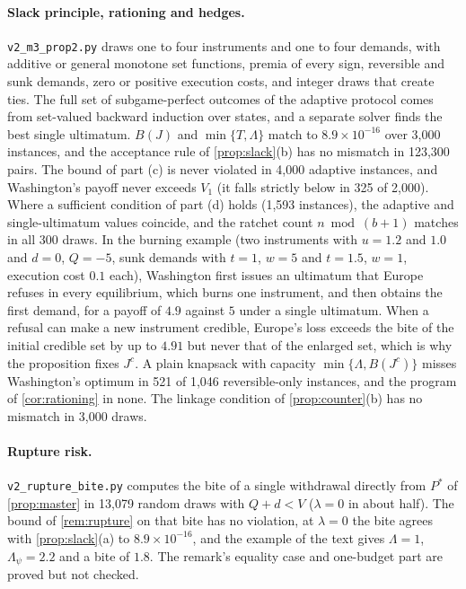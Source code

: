 \paragraph{Slack principle, rationing and hedges.} \texttt{v2\_m3\_prop2.py} draws one to four instruments and one to four demands, with additive or general monotone set functions, premia of every sign, reversible and sunk demands, zero or positive execution costs, and integer draws that create ties. The full set of subgame-perfect outcomes of the adaptive protocol comes from set-valued backward induction over states, and a separate solver finds the best single ultimatum. $B(J)$ and $\min\{T,\Lambda\}$ match to $8.9\times10^{-16}$ over 3,000 instances, and the acceptance rule of \cref{prop:slack}(b) has no mismatch in 123,300 pairs. The bound of part (c) is never violated in 4,000 adaptive instances, and Washington's payoff never exceeds $V_1$ (it falls strictly below in 325 of 2,000). Where a sufficient condition of part (d) holds (1,593 instances), the adaptive and single-ultimatum values coincide, and the ratchet count $n\bmod(b+1)$ matches in all 300 draws. In the burning example (two instruments with $u=1.2$ and $1.0$ and $d=0$, $Q=-5$, sunk demands with $t=1$, $w=5$ and $t=1.5$, $w=1$, execution cost $0.1$ each), Washington first issues an ultimatum that Europe refuses in every equilibrium, which burns one instrument, and then obtains the first demand, for a payoff of $4.9$ against $5$ under a single ultimatum. When a refusal can make a new instrument credible, Europe's loss exceeds the bite of the initial credible set by up to $4.91$ but never that of the enlarged set, which is why the proposition fixes $J^c$. A plain knapsack with capacity $\min\{\Lambda,B(J^c)\}$ misses Washington's optimum in 521 of 1,046 reversible-only instances, and the program of \cref{cor:rationing} in none. The linkage condition of \cref{prop:counter}(b) has no mismatch in 3,000 draws.

\paragraph{Rupture risk.} \texttt{v2\_rupture\_bite.py} computes the bite of a single withdrawal directly from $P^*$ of \cref{prop:master} in 13,079 random draws with $Q+d<V$ ($\lambda=0$ in about half). The bound of \cref{rem:rupture} on that bite has no violation, at $\lambda=0$ the bite agrees with \cref{prop:slack}(a) to $8.9\times10^{-16}$, and the example of the text gives $\Lambda=1$, $\Lambda_\psi=2.2$ and a bite of $1.8$. The remark's equality case and one-budget part are proved but not checked.

